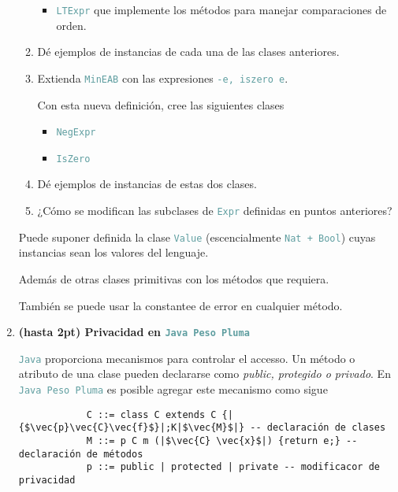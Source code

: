 \documentclass{article}
\newcommand{\tx}[1]{\textcolor{CadetBlue} {\texttt{#1}}}
\newcommand{\tb}[1]{\textcolor{RoyalPurple} {\textbf{#1}}}
\newcommand{\ti}[1]{\textcolor{RoyalPurple} {\textit{#1}}}
\newcommand{\pt}[1]{\textcolor{RoyalPurple}{(#1pt)}}
\begin{document}
\begin{enumerate}
\begin{enumerate}
\begin{itemize}
                \item \tx{LTExpr} que implemente los métodos para manejar 
                comparaciones de orden.
            \end{itemize}

            \item Dé ejemplos de instancias de cada una de las clases 
            anteriores.

            \item Extienda \tx{MinEAB} con las expresiones \tx{-e, iszero e}.

            Con esta nueva definición, cree las siguientes clases

            \begin{itemize}
                \item \tx{NegExpr}
                \item \tx{IsZero}
            \end{itemize}

            \item Dé ejemplos de instancias de estas dos clases.

            \item ¿Cómo se modifican las subclases de \tx{Expr} definidas en
            puntos anteriores?
        \end{enumerate}

        Puede suponer definida la clase \tx{Value} (escencialmente 
        \tx{Nat + Bool}) cuyas instancias sean los valores del lenguaje.

        Además de otras clases primitivas con los métodos que requiera.

        También se puede usar la constantee de error en cualquier método.

        \item \tb{\pt{hasta 2} Privacidad en \tx{Java Peso Pluma}}

        \tx{Java} proporciona mecanismos para controlar el accesso. Un método o
        atributo de una clase pueden declararse como \ti{public, protegido o 
        privado}. En \tx{Java Peso Pluma} es posible agregar este mecanismo como
        sigue

        \begin{verbatim}
            C ::= class C extends C {|{$\vec{p}\vec{C}\vec{f}$}|;K|$\vec{M}$|} -- declaración de clases
            M ::= p C m (|$\vec{C} \vec{x}$|) {return e;} -- declaración de métodos
            p ::= public | protected | private -- modificacor de privacidad
        \end{verbatim}


\end{enumerate}
\end{document}
